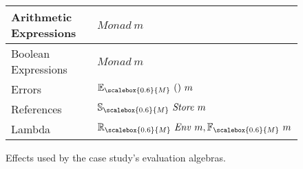 \begin{figure}[t]
  \centering
  \begin{tabular}{| l | l |}
    \hline
    Arithmetic Expressions & $\mathit{Monad}~m$ \\
    \hline
    Boolean Expressions & $\mathit{Monad}~m$\\
    \hline
    Errors & $\mathbb{E}_{\scalebox{0.6}{M}}~()~m$ \\
    \hline
    References & $\mathbb{S}_{\scalebox{0.6}{M}}~\mathit{Store}~m$ \\
    \hline
    Lambda & $\mathbb{R}_{\scalebox{0.6}{M}}~\mathit{Env}~m, \mathbb{F}_{\scalebox{0.6}{M}}~m$\\
    \hline
  \end{tabular}
  \caption{Effects used by the case study's evaluation algebras.}
\vspace{-.3cm}
  \label{fig:FeatureEffects}
\end{figure}
